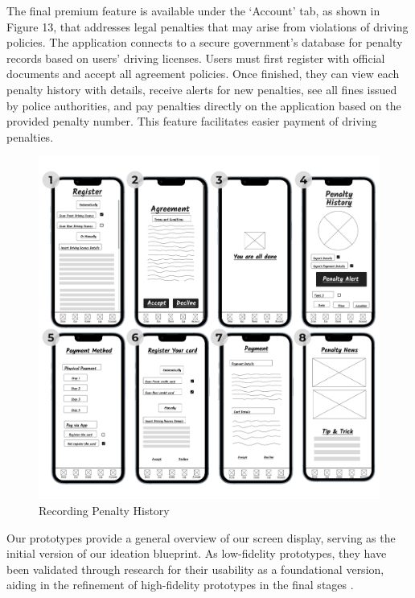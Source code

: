 \documentclass[12pt,a4paper]{article}
\begin{document}
\noindent The final premium feature is available under the `Account' tab, as shown in Figure 13, that addresses legal penalties that may arise from violations of driving policies. The application connects to a secure government's database for penalty records based on users' driving licenses. Users must first register with official documents and accept all agreement policies. Once finished, they can view each penalty history with details, receive alerts for new penalties, see all fines issued by police authorities, and pay penalties directly on the application based on the provided penalty number. This feature facilitates easier payment of driving penalties.\\
\begin{figure}[h]
    \centering
    \includegraphics[width=0.8
    \textwidth]{images/Prototype Figures/Prototype Figure 8.png}
    \caption{Recording Penalty History}
    \label{fig:example}
\end{figure}
\pagebreak



\noindent Our prototypes provide a general overview of our screen display, serving as the initial version of our ideation blueprint. As low-fidelity prototypes, they have been validated through research for their usability as a foundational version, aiding in the refinement of high-fidelity prototypes in the final stages \citep{question_6.2}.\\

\pagebreak

\end{document}

